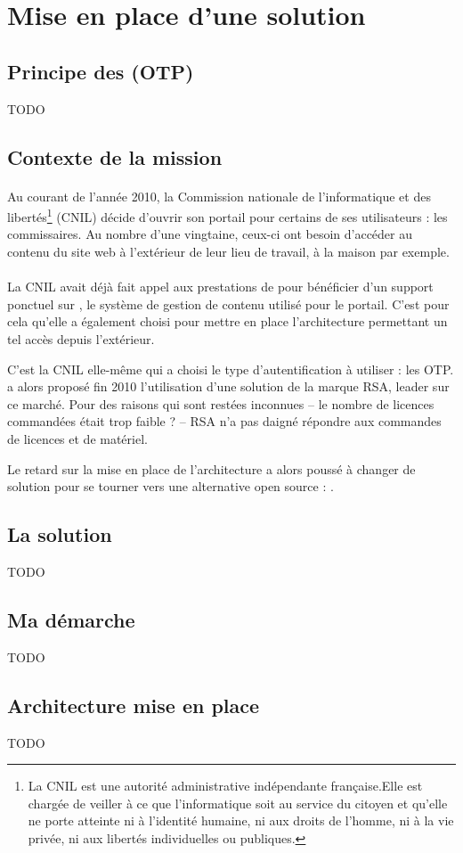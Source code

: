 \section{Mise en place d'une solution \alinotp{}}

\subsection{Principe des  (OTP)}

TODO


\subsection{Contexte de la mission}

\paragraph{}
Au courant de l'année 2010, la Commission nationale de l'informatique et des libertés\footnote{La CNIL est une autorité administrative indépendante française.Elle est chargée de veiller à ce que l'informatique soit au service du citoyen et qu'elle ne porte atteinte ni à l'identité humaine, ni aux droits de l'homme, ni à la vie privée, ni aux libertés individuelles ou publiques.\cite{cnil}} (CNIL) décide d'ouvrir son portail \aintranet{} pour certains de ses utilisateurs : les commissaires.
Au nombre d'une vingtaine, ceux-ci ont besoin d'accéder au contenu du site web à l'extérieur de leur lieu de travail, à la maison par exemple.

\paragraph{}
La CNIL avait déjà fait appel aux prestations de \asmile{} pour bénéficier d'un support ponctuel sur \atypo{}, le système de gestion de contenu utilisé pour le portail.
C'est pour cela qu'elle a également choisi \asmile{} pour mettre en place l'architecture permettant un tel accès depuis l'extérieur.

C'est la CNIL elle-même qui a choisi le type d'autentification à utiliser : les OTP. \asmile{} a alors proposé fin 2010 l'utilisation d'une solution de la marque RSA, leader sur ce marché.
Pour des raisons qui sont restées inconnues -- le nombre de licences commandées était trop faible ? -- RSA n'a pas daigné répondre aux commandes de licences et de matériel.

Le retard sur la mise en place de l'architecture a alors poussé \asmile{} à changer de solution pour se tourner vers une alternative open source : \alinotp{}.


\subsection{La solution \alinotp{}}

TODO


\subsection{Ma démarche}

TODO


\subsection{Architecture mise en place}

TODO

